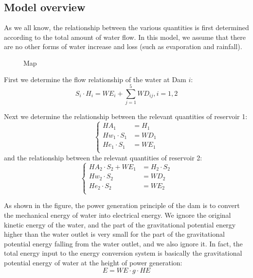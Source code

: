 \documentclass{mcmthesis}
\begin{document}
\subsection{Model overview}
As we all know, the relationship between the various quantities is first determined according to the total amount of water flow. In this model, we assume that there are no other forms of water increase and loss (such as evaporation and rainfall).
\begin{figure}[h]
	\caption{Map}
	\centering
\end{figure}

First we determine the flow relationship of the water at Dam $i$:
\begin{equation}
	S_i\cdot H_i=WE_i+\sum_{j=1}^{5}WD_{ij},i=1,2
\end{equation}

Next we determine the relationship between the relevant quantities of reservoir 1:
\begin{equation} 
	\left\{ 
	\begin{aligned}
		HA_1&=H_1\\
		Hw_1\cdot S_1&=WD_1\\
		He_1\cdot S_1&=WE_1\\
	\end{aligned}
	\right. 
\end{equation} 
and the relationship between the relevant quantities of reservoir 2:
\begin{equation} 
	\left\{ 
	\begin{aligned}
		HA_2\cdot S_2+WE_1&=H_2\cdot S_2\\
		Hw_2\cdot S_2&=WD_2\\
		He_2\cdot S_2&=WE_2\\
	\end{aligned}
	\right. 
\end{equation} 

As shown in the figure, the power generation principle of the dam is to convert the mechanical energy of water into electrical energy. We ignore the original kinetic energy of the water, and the part of the gravitational potential energy higher than the water outlet is very small for the part of the gravitational potential energy falling from the water outlet, and we also ignore it. In fact, the total energy input to the energy conversion system is basically the gravitational potential energy of water at the height of power generation:
\begin{equation}
	E=WE\cdot g \cdot HE
\end{equation}
\end{document}
